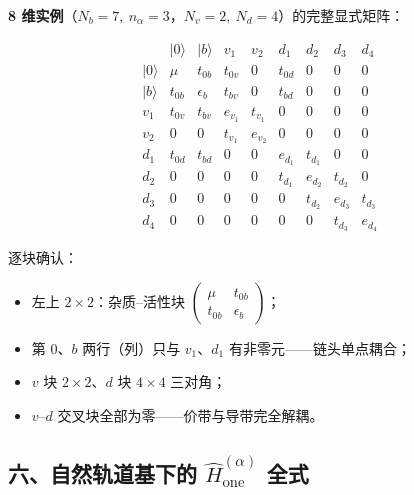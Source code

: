 \documentclass[11pt]{ctexart}
\begin{document}
\textbf{8 维实例}（$N_b=7,\ n_\alpha=3$，$N_v=2,\ N_d=4$）的完整显式矩阵：

\[
\begin{array}{c|cccccccc}
 & |0\rangle & |b\rangle & v_1 & v_2 & d_1 & d_2 & d_3 & d_4\\[2pt]
\hline
|0\rangle & \mu & t_{0b} & t_{0v} & 0 & t_{0d} & 0 & 0 & 0\\[2pt]
|b\rangle & t_{0b} & \epsilon_b & t_{bv} & 0 & t_{bd} & 0 & 0 & 0\\[2pt]
v_1 & t_{0v} & t_{bv} & e_{v_1} & t_{v_1} & 0 & 0 & 0 & 0\\[2pt]
v_2 & 0 & 0 & t_{v_1} & e_{v_2} & 0 & 0 & 0 & 0\\[2pt]
d_1 & t_{0d} & t_{bd} & 0 & 0 & e_{d_1} & t_{d_1} & 0 & 0\\[2pt]
d_2 & 0 & 0 & 0 & 0 & t_{d_1} & e_{d_2} & t_{d_2} & 0\\[2pt]
d_3 & 0 & 0 & 0 & 0 & 0 & t_{d_2} & e_{d_3} & t_{d_3}\\[2pt]
d_4 & 0 & 0 & 0 & 0 & 0 & 0 & t_{d_3} & e_{d_4}
\end{array}
\]

逐块确认：

\begin{itemize}
\item 左上 $2\times2$：杂质--活性块 $\begin{pmatrix}\mu&t_{0b}\\ t_{0b}&\epsilon_b\end{pmatrix}$；
\item 第 $0$、$b$ 两行（列）只与 $v_1$、$d_1$ 有非零元——链头单点耦合；
\item $v$ 块 $2\times2$、$d$ 块 $4\times4$ 三对角；
\item $v$--$d$ 交叉块全部为零——价带与导带完全解耦。
\end{itemize}

\subsection{六、自然轨道基下的 $\hat H_{\mathrm{one}}^{(\alpha)}$ 全式}
\end{document}
